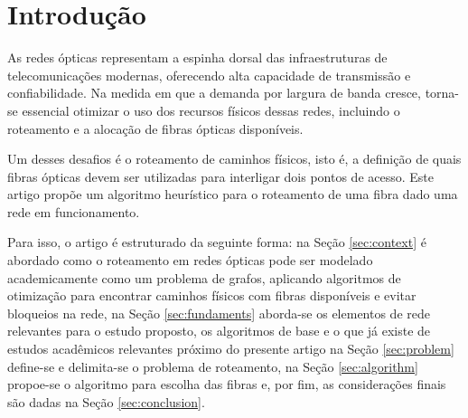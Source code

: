 \section{Introdução}

As redes ópticas representam a espinha dorsal das infraestruturas de
telecomunicações modernas, oferecendo alta capacidade de transmissão e
confiabilidade. Na medida em que a demanda por largura de banda cresce,
torna-se essencial otimizar o uso dos recursos físicos dessas redes, incluindo
o roteamento e a alocação de fibras ópticas disponíveis.

Um desses desafios é o roteamento de caminhos físicos, isto é, a definição de
quais fibras ópticas devem ser utilizadas para interligar dois pontos de
acesso. Este artigo propõe um algoritmo heurístico para o roteamento de uma
fibra dado uma rede em funcionamento.

Para isso, o artigo é estruturado da seguinte forma: na Seção \ref{sec:context}
é abordado como o roteamento em redes ópticas pode ser modelado academicamente
como um problema de grafos, aplicando algoritmos de otimização para encontrar
caminhos físicos com fibras disponíveis e evitar bloqueios na rede, na Seção
\ref{sec:fundaments} aborda-se os elementos de rede relevantes para o estudo
proposto, os algoritmos de base e o que já existe de estudos acadêmicos
relevantes próximo do presente artigo na Seção \ref{sec:problem} define-se e
delimita-se o problema de roteamento, na Seção \ref{sec:algorithm} propoe-se o
algoritmo para escolha das fibras e, por fim, as considerações finais são dadas
na Seção \ref{sec:conclusion}.

